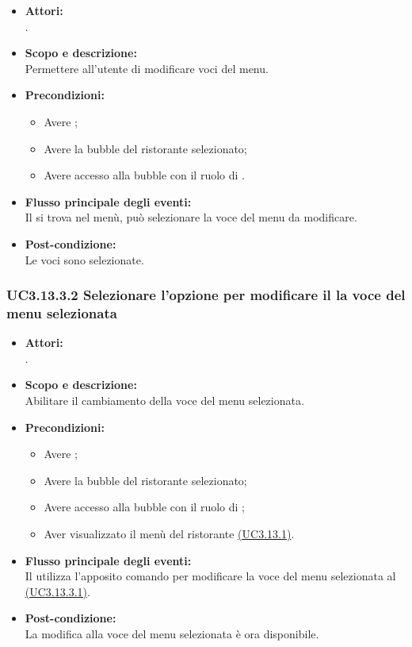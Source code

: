 \begin{itemize}
	\item \textbf{Attori:}
	\\.
	\item \textbf{Scopo e descrizione:} 
	\\Permettere all'utente  di modificare voci del menu.
	\item \textbf{Precondizioni:}
	\begin{itemize}
		\item Avere ;
		\item Avere la bubble del ristorante selezionato;
		\item Avere accesso alla bubble con il ruolo di .
	\end{itemize}
	\item \textbf{Flusso principale degli eventi:}
	\\Il {} si trova nel menù, può selezionare la voce del menu da modificare.
	\item \textbf{Post-condizione:}
	\\Le voci sono selezionate.
\end{itemize}

\subsubsection{UC3.13.3.2 Selezionare l'opzione per modificare il la voce del menu selezionata} \label{UC3.13.3.2}

\begin{itemize}
	\item \textbf{Attori:}
	\\.
	\item \textbf{Scopo e descrizione:} 
	\\Abilitare il cambiamento della voce del menu selezionata.
	\item \textbf{Precondizioni:}
	\begin{itemize}
		\item Avere ;
		\item Avere la bubble del ristorante selezionato;
		\item Avere accesso alla bubble con il ruolo di ;
		\item Aver visualizzato il menù del ristorante \hyperref[UC3.13.1]{(UC3.13.1)}.
	\end{itemize}
	\item \textbf{Flusso principale degli eventi:}
	\\Il {} utilizza l'apposito comando per modificare la voce del menu selezionata al  \hyperref[UC3.13.3.1]{(UC3.13.3.1)}.
	\item \textbf{Post-condizione:}
	\\La modifica alla voce del menu selezionata è ora disponibile.
\end{itemize}

